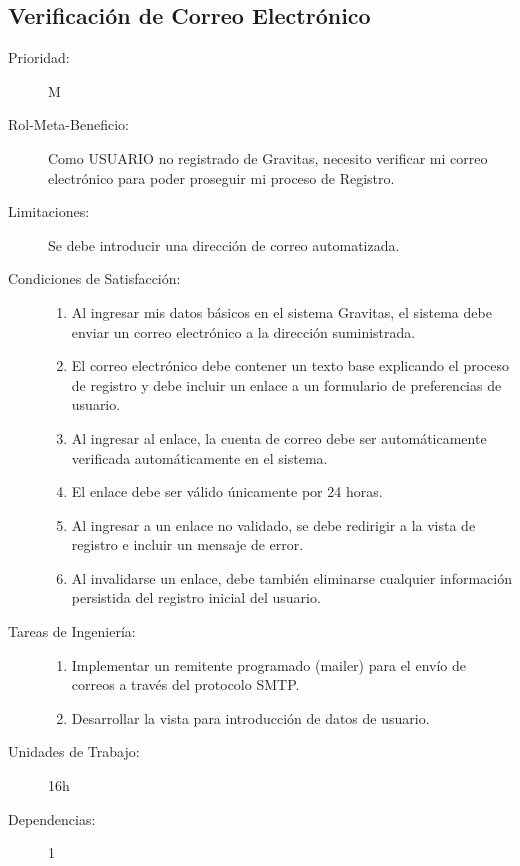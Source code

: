 \newpage

\subsection{Verificación de Correo Electrónico}

\begin{description}
    \item[Prioridad:] M
    \item[Rol-Meta-Beneficio:] Como USUARIO no registrado de Gravitas, necesito verificar mi correo electrónico para poder proseguir mi proceso de Registro.
    \item[Limitaciones:]  Se debe introducir una dirección de correo automatizada.
    \item[Condiciones de Satisfacción:] \hfill
        \begin{enumerate}
            \item Al ingresar mis datos básicos en el sistema Gravitas, el sistema debe enviar un correo electrónico a la dirección suministrada.
            \item El correo electrónico debe contener un texto base explicando el proceso de registro y debe incluir un enlace a un formulario de preferencias de usuario.
            \item Al ingresar al enlace, la cuenta de correo debe ser automáticamente verificada automáticamente en el sistema.
            \item El enlace debe ser válido únicamente por 24 horas.
            \item Al ingresar a un enlace no validado, se debe redirigir a la vista de registro e incluir un mensaje de error.
            \item Al invalidarse un enlace, debe también eliminarse cualquier información persistida del registro inicial del usuario.
        \end{enumerate}
    \item[Tareas de Ingeniería:] \hfill
        \begin{enumerate}
            \item Implementar un remitente programado (mailer) para el envío de  correos a través del protocolo SMTP.
            \item Desarrollar la vista para introducción de datos de usuario.
        \end{enumerate}
    \item[Unidades de Trabajo:] 16h
    \item[Dependencias:] 1
\end{description}


